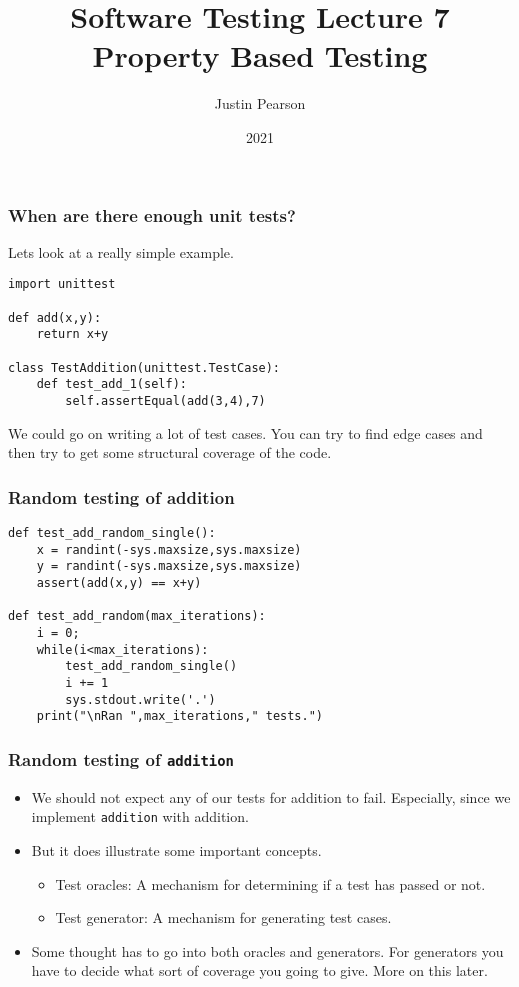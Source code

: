 \documentclass{beamer}
\title{Software Testing  Lecture 7 \\ Property Based Testing}
\author{Justin Pearson}
\date{2021}
\begin{document}
\lstset{language=Python}

\begin{frame}
  \maketitle
\end{frame}

\begin{frame}[fragile]
  \frametitle{When are there enough unit tests?}
  Lets look at a really simple example.
  \begin{lstlisting}
import unittest

def add(x,y):
    return x+y

class TestAddition(unittest.TestCase):
    def test_add_1(self):
        self.assertEqual(add(3,4),7)

      \end{lstlisting}
We could go on writing a lot of test cases. You can try to find edge cases and
then try to get some structural coverage of the code. 
\end{frame}
\begin{frame}[fragile]
  \frametitle{Random testing of addition}
  \begin{lstlisting}
def test_add_random_single():
    x = randint(-sys.maxsize,sys.maxsize)
    y = randint(-sys.maxsize,sys.maxsize)
    assert(add(x,y) == x+y)

def test_add_random(max_iterations):
    i = 0;
    while(i<max_iterations):
        test_add_random_single()
        i += 1
        sys.stdout.write('.')
    print("\nRan ",max_iterations," tests.")
  \end{lstlisting}
\end{frame}
\begin{frame}
  \frametitle{Random testing of {\tt addition}}
  \begin{itemize}
  \item We should not expect any of our tests for addition to
    fail. Especially, since we implement {\tt addition} with addition.
  \item But it does illustrate some important concepts.
    \begin{itemize}
    \item Test oracles: A mechanism for determining if a test has passed or
      not.
    \item Test generator: A mechanism for generating test cases. 
      
    \end{itemize}
  \item Some thought has to go into both oracles and generators. For
    generators you have to decide what sort of coverage you going to
    give. More on this later.
  \end{itemize}
  
\end{frame}
\end{document}
